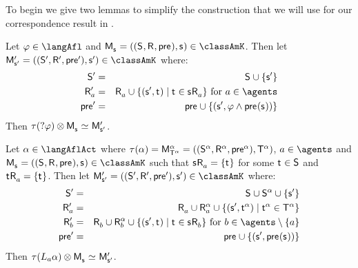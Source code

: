 To begin we give two lemmas to simplify the construction that we will use for our correspondence result in \classK{}.

\begin{lemma}\label{afl-k-construction-test}
    Let $\phi \in \langAfl$ and $\aPModel{\aStateS} = \aPModelTuple{\aStateS} \in \classAmK$.
    Then let $\aPModel[\prime]{\aStateS[\prime]} = \aPModelTuple[\prime]{\aStateS[\prime]} \in \classAmK$ where:
    \begin{eqnarray*}
        \aStates[\prime] &=& \aStates \cup \{\aStateS[\prime]\}\\
        \aAccessibility[\prime]{\agentA} &=& \aAccessibility{\agentA} \cup \{(\aStateS[\prime], \aStateT) \mid \aStateT \in \aStateS \aAccessibility{\agentA}\} \text{ for } \agentA \in \agents\\
        \aPrecondition[\prime] &=& \aPrecondition \cup \{(\aStateS[\prime], \phi \land \aPrecondition(\aStateS))\}
    \end{eqnarray*}
    Then $\tau(\test{\phi}) \exec \aPModel{\aStateS}  \bisimilar \aPModel[\prime]{\aStateS[\prime]}$.
\end{lemma}

\begin{lemma}\label{afl-k-construction-learning}
    Let $\alpha \in \langAflAct$ where $\tau(\alpha) = \aPModel[\alpha]{\aStatesT[\alpha]} = \aPModelTuple[\alpha]{\aStatesT[\alpha]}$, $\agentA \in \agents$ and $\aPModel{\aStateS} = \aPModelTuple{\aStateS} \in \classAmK$ such that $\aStateS \aAccessibility{\agentA} = \{\aStateT\}$ for some $\aStateT \in \aStates$ and $\aStateT \aAccessibility{\agentA} = \{\aStateT\}$.
    Then let $\aPModel[\prime]{\aStateS[\prime]} = \aPModelTuple[\prime]{\aStateS[\prime]} \in \classAmK$ where:
    \begin{eqnarray*}
        \aStates[\prime] &=& \aStates \cup \aStates[\alpha] \cup \{\aStateS[\prime]\}\\
        \aAccessibility[\prime]{\agentA} &=& \aAccessibility{\agentA} \cup \aAccessibility[\alpha]{\agentA} \cup \{(\aStateS[\prime], \aStateT[\alpha]) \mid \aStateT[\alpha] \in \aStatesT[\alpha]\}\\
        \aAccessibility[\prime]{\agentB} &=& \aAccessibility{\agentB} \cup \aAccessibility[\alpha]{\agentB} \cup \{(\aStateS[\prime], \aStateT) \mid \aStateT \in \aStateS \aAccessibility{\agentB}\} \text{ for } \agentB \in \agents \setminus \{\agentA\}\\
        \aPrecondition[\prime] &=& \aPrecondition \cup \{(\aStateS[\prime], \aPrecondition(\aStateS))\}
    \end{eqnarray*}
    Then $\tau(\learns_\agentA \alpha) \exec \aPModel{\aStateS} \bisimilar \aPModel[\prime]{\aStateS[\prime]}$.
\end{lemma}

